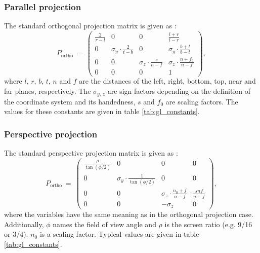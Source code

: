 \subsubsection{Parallel projection}
The standard orthogonal projection matrix is given as \cite{web_gl_ortho}:
\begin{equation}
	P_{\mathrm{ortho}} \ =\
		\left( \begin{array}{cccc}
			\frac{2}{r-l} &                             0 &                             0 &  \frac{l+r}{l-r}                  \\
			            0 &  \sigma_y \cdot \frac{2}{t-b} &                             0 &  \sigma_y \cdot \frac{b+t}{b-t}   \\
			            0 &                             0 &  \sigma_z \cdot \frac{s}{n-f} &  \sigma_z \cdot \frac{n+f_0}{n-f} \\
			            0 &                             0 &                             0 &  1
		\end{array} \right),
\end{equation}
where $l$, $r$, $b$, $t$, $n$ and $f$ are the distances of the left, right, bottom, top, near and far planes, respectively.
The $\sigma_{y,\, z}$ are sign factors depending on the definition of the coordinate system and its handedness,
$s$ and $f_0$ are scaling factors. The values for these constants are given in table \ref{tab:gl_constants}.



\subsubsection{Perspective projection}
The standard perspective projection matrix is given as \cite{web_gl_perspective}:
\begin{equation}
	P_{\mathrm{ortho}} \ =\
		\left( \begin{array}{cccc}
			\frac{\rho}{\tan\left(\phi/2 \right)} &                                                  0 &                                 0 &  0                 \\
			                                    0 &  \sigma_y \cdot \frac{1}{\tan\left(\phi/2 \right)} &                                 0 &  0                 \\
			                                    0 &                                                  0 &  \sigma_z \cdot \frac{n_0+f}{n-f} &  \frac{s n f}{n-f} \\
			                                    0 &                                                  0 &                         -\sigma_z &  0
		\end{array} \right),
\end{equation}
where the variables have the same meaning as in the orthogonal projection case.
Additionally, $\phi$ names the field of view angle and $\rho$ is the screen ratio (e.g. 9/16 or 3/4).
$n_0$ is a scaling factor. Typical values are given in table \ref{tab:gl_constants}.


